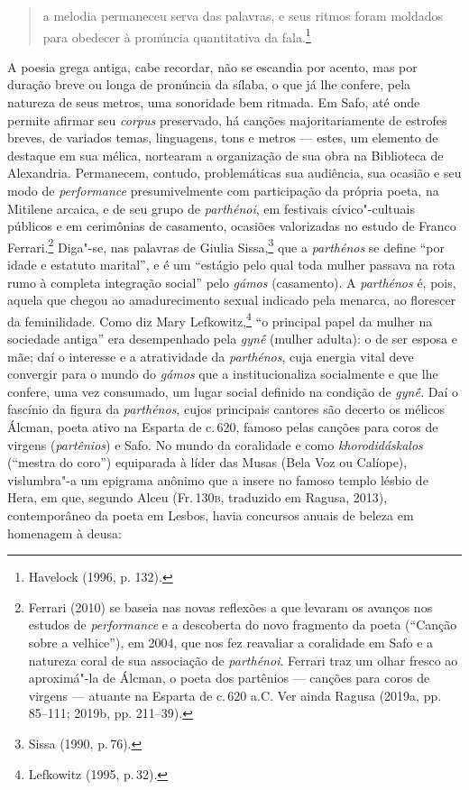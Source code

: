 \begin{quote}
a melodia permaneceu serva
das palavras, e seus ritmos foram moldados para obedecer à pronúncia
quantitativa da fala.\footnote{ Havelock (1996, p. 132).}
\end{quote}

 A poesia grega antiga, cabe recordar, não se
escandia por acento, mas por duração breve ou longa de pronúncia da sílaba, o
que já lhe confere, pela natureza de seus metros, uma sonoridade bem ritmada. Em Safo, até onde permite afirmar seu \textit{corpus} preservado,
há canções majoritariamente de estrofes breves, de variados temas,
linguagens, tons e metros --- estes, um elemento de destaque em sua mélica, nortearam a organização de sua obra na Biblioteca de Alexandria.
Permanecem, contudo, problemáticas
sua audiência, sua ocasião e seu modo de \textit{performance} presumivelmente com participação da própria poeta, na Mitilene arcaica, e de seu grupo de \textit{parthénoi}, em festivais cívico"-cultuais públicos e em cerimônias de casamento, ocasiões valorizadas no estudo de Franco Ferrari.\footnote{Ferrari (2010) se baseia nas novas reflexões a que levaram os avanços nos estudos de \textit{performance} e a descoberta do novo fragmento da poeta (``Canção sobre a velhice''), em 2004, que nos fez reavaliar a coralidade em Safo e a natureza coral de sua associação de \textit{parthénoi}. Ferrari traz um olhar fresco ao aproximá"-la de Álcman, o poeta dos partênios --- canções para coros de virgens --- atuante na Esparta de c.\,620 a.C. Ver ainda Ragusa (2019a, pp. 85--111; 2019b, pp. 211--39).}
Diga"-se, nas palavras de Giulia Sissa,\footnote{Sissa (1990, p.\,76).} que a \textit{parthénos} se define “por idade e estatuto marital”, e é um “estágio pelo qual toda mulher passava na rota rumo à completa integração social” pelo \textit{gámos} (casamento). A \textit{parthénos} é, pois, aquela que chegou ao amadurecimento sexual indicado pela menarca, ao florescer da feminilidade. Como diz Mary Lefkowitz,\footnote{Lefkowitz (1995, p.\,32).} “o principal papel da mulher na sociedade antiga” era desempenhado pela \textit{gynḗ } (mulher adulta): o de ser esposa e mãe; daí o interesse e a atratividade da \textit{parthénos}, cuja energia vital deve convergir para o mundo do \textit{gámos} que a institucionaliza socialmente e que lhe confere, uma vez consumado, um lugar social definido na condição de \textit{gynḗ.} Daí o fascínio da figura da \textit{parthénos}, cujos principais cantores são decerto os mélicos Álcman, poeta ativo na Esparta de c.\,620, famoso pelas canções para coros de virgens (\textit{partênios}) e Safo.
No mundo da coralidade e como \textit{khorodidáskalos} (``mestra do coro'') equiparada à líder das Musas (Bela Voz ou Calíope), vislumbra"-a um epigrama anônimo que a insere no famoso templo lésbio de Hera, em que, segundo Alceu (Fr.\,130\textsc{b}, traduzido em Ragusa, 2013), contemporâneo da poeta em Lesbos, havia concursos anuais de beleza em homenagem à deusa:

